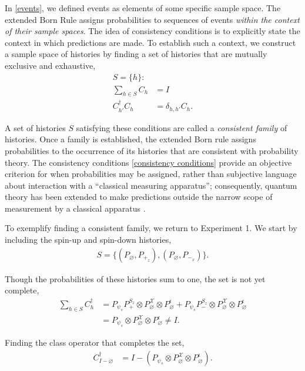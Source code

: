In \autoref{events}, we defined events as elements of some specific sample space. The extended Born Rule assigns probabilities to sequences of events \textit{within the context of their sample spaces}. The idea of consistency conditions is to explicitly state the context in which predictions are made. To establish such a context, we construct a sample space of histories by finding a set of histories that are mutually exclusive and exhaustive,
\begin{align} \label{consistency conditions}
  S = \{h \}: \\ \nonumber
  \sum_{h \in S} C_h &= I \\ \nonumber
  C_{h'}^\dagger C_h &= \delta_{h,h'} C_h.
\end{align}

A set of histories $S$ satisfying these conditions are called a \textit{consistent family} of histories. Once a family is established, the extended Born rule assigns probabilities to the occurrence of its histories that are consistent with probability theory. The consistency conditions \autoref{consistency conditions} provide an objective criterion for when probabilities may be assigned, rather than subjective language about interaction with a ``classical measuring apparatus''; consequently, quantum theory has been extended to make predictions outside the narrow scope of measurement by a classical apparatus \cite{Craig}.

To exemplify finding a consistent family, we return to Experiment 1. We start by including the spin-up and spin-down histories,
\begin{align}
  S = \{ \left(P_\varnothing, P_{+_z} \right), \left(P_\varnothing, P_{-_x} \right)\}.
\end{align}

Though the probabilities of these histories sum to one, the set is not yet complete,
\begin{align}
  \sum_{h \in S} C_h^\dagger &= P_{\psi_s} P^{S_z}_+ \otimes P^\mathcal{X}_\varnothing \otimes P^\epsilon_\varnothing + P_{\psi_s} P^{S_z}_- \otimes P^\mathcal{X}_\varnothing \otimes P^\epsilon_\varnothing \\ \nonumber
  &= P_{\psi_s} \otimes P^\mathcal{X}_\varnothing \otimes P^\epsilon_\varnothing \neq I.
\end{align}

Finding the class operator that completes the set,
\begin{align}
  C^\dagger_{I-\varnothing} &= I - \left(P_{\psi_s} \otimes P^\mathcal{X}_\varnothing \otimes P^\epsilon_\varnothing \right).
\end{align}

